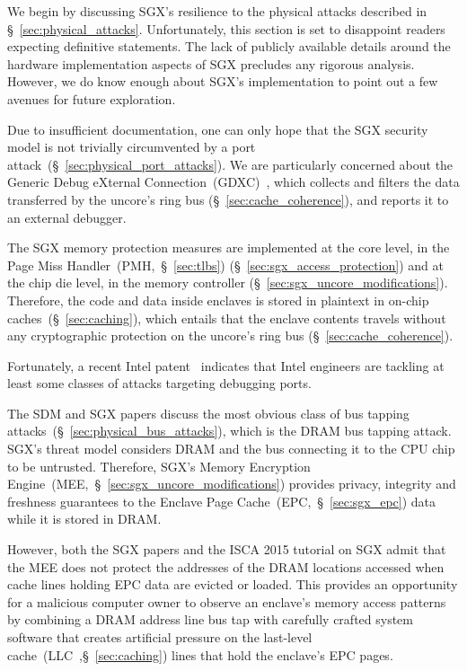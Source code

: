 \label{sec:sgx_vs_physical_attacks}

We begin by discussing SGX's resilience to the physical attacks described in
\S~\ref{sec:physical_attacks}. Unfortunately, this section is set to disappoint
readers expecting definitive statements. The lack of publicly available details
around the hardware implementation aspects of SGX precludes any rigorous
analysis. However, we do know enough about SGX's implementation to point out a
few avenues for future exploration.

Due to insufficient documentation, one can only hope that the SGX security
model is not trivially circumvented by a port
attack~(\S~\ref{sec:physical_port_attacks}). We are particularly concerned
about the Generic Debug eXternal
Connection~(GDXC)~\cite{yuffe2011sandybridge, intel2011gdxc}, which collects
and filters the data transferred by the uncore's ring bus
(\S~\ref{sec:cache_coherence}), and reports it to an external debugger.

The SGX memory protection measures are implemented at the core level, in the
Page Miss Handler~(PMH,~\S~\ref{sec:tlbs}) (\S~\ref{sec:sgx_access_protection})
and at the chip die level, in the memory controller
(\S~\ref{sec:sgx_uncore_modifications}). Therefore, the code and data inside
enclaves is stored in plaintext in on-chip caches~(\S~\ref{sec:caching}), which
entails that the enclave contents travels without any cryptographic protection
on the uncore's ring bus (\S~\ref{sec:cache_coherence}).

Fortunately, a recent Intel patent~\cite{shanbhogue2015gdxcsgx} indicates that
Intel engineers are tackling at least some classes of attacks targeting
debugging ports.

The SDM and SGX papers discuss the most obvious class of bus tapping
attacks~(\S~\ref{sec:physical_bus_attacks}), which is the DRAM bus tapping
attack. SGX's threat model considers DRAM and the bus connecting it to the CPU
chip to be untrusted. Therefore, SGX's Memory Encryption
Engine~(MEE,~\S~\ref{sec:sgx_uncore_modifications}) provides privacy, integrity
and freshness guarantees to the Enclave Page Cache~(EPC,~\S~\ref{sec:sgx_epc})
data while it is stored in DRAM.

However, both the SGX papers and the ISCA 2015 tutorial on SGX admit that the
MEE does not protect the addresses of the DRAM locations accessed when cache
lines holding EPC data are evicted or loaded. This provides an opportunity for
a malicious computer owner to observe an enclave's memory access patterns by
combining a DRAM address line bus tap with carefully crafted system software
that creates artificial pressure on the last-level
cache~(LLC~,\S~\ref{sec:caching}) lines that hold the enclave's EPC pages.

